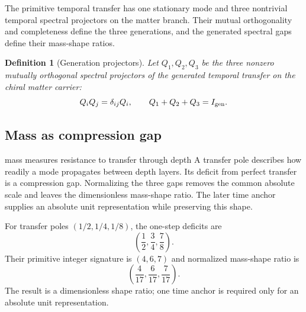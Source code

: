 \documentclass[11pt]{article}
\numberwithin{equation}{section}
\newtheorem{definition}{Definition}[section]
\theoremstyle{remark}
\begin{document}
The primitive temporal transfer has one stationary mode and three nontrivial temporal spectral projectors on the matter branch. Their mutual orthogonality and completeness define the three generations, and the generated spectral gaps define their mass-shape ratios.

\begin{definition}[Generation projectors]
Let $Q_1,Q_2,Q_3$ be the three nonzero mutually orthogonal spectral projectors of the generated temporal transfer on the chiral matter carrier:
\begin{equation}
Q_iQ_j=\delta_{ij}Q_i,
\qquad Q_1+Q_2+Q_3=I_{\rm gen}.
\end{equation}
\end{definition}

\subsection{Mass as compression gap}
\begin{interpretivebridge}{mass measures resistance to transfer through depth}
A transfer pole describes how readily a mode propagates between depth layers. Its deficit from perfect transfer is a compression gap. Normalizing the three gaps removes the common absolute scale and leaves the dimensionless mass-shape ratio. The later time anchor supplies an absolute unit representation while preserving this shape.
\end{interpretivebridge}

For transfer poles $(1/2,1/4,1/8)$, the one-step deficits are
\begin{equation}
\left(\frac12,\frac34,\frac78\right).
\end{equation}
Their primitive integer signature is $(4,6,7)$ and normalized mass-shape ratio is
\begin{equation}
\left(\frac4{17},\frac6{17},\frac7{17}\right).
\end{equation}
The result is a dimensionless shape ratio; one time anchor is required only for an absolute unit representation.
\end{document}

